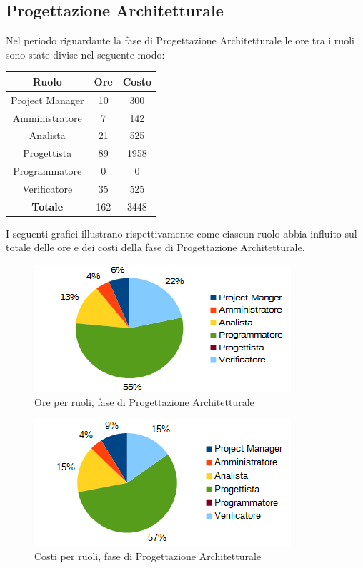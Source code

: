 	\subsection{Progettazione Architetturale}
	Nel periodo riguardante la fase di Progettazione Architetturale le ore tra i ruoli sono state divise nel seguente modo: \\
	\begin{table}[H]
		\centering
		\begin{tabular}{|c|c|c|}
			\hline
			\textbf{Ruolo}		& \textbf{Ore}	& \textbf{Costo} \\
			\hline
			Project Manager		& 10			& 300	\\
			Amministratore		& 7				& 142	\\
			Analista			& 21			& 525	\\
			Progettista			& 89			& 1958	\\
			Programmatore		& 0				& 0	\\
			Verificatore		& 35			& 525	\\
			\hline
			\textbf{Totale}		& 162			& 3448	\\
			\hline
		\end{tabular}
		\end{table}
	I seguenti grafici illustrano rispettivamente come ciascun ruolo abbia influito sul totale
delle ore e dei costi della fase di Progettazione Architetturale. \\
	\begin{figure}[H]
		\centering
		\includegraphics[scale=1]{immagini/grafici/progettazione_architetturale-torta.png}
		\caption{Ore per ruoli, fase di Progettazione Architetturale}
	\end{figure}
	\begin{figure}[H]
		\centering
		\includegraphics[scale=1]{immagini/grafici/progettazione_architetturale-torta-costo.png}
		\caption{Costi per ruoli, fase di Progettazione Architetturale}
	\end{figure}
